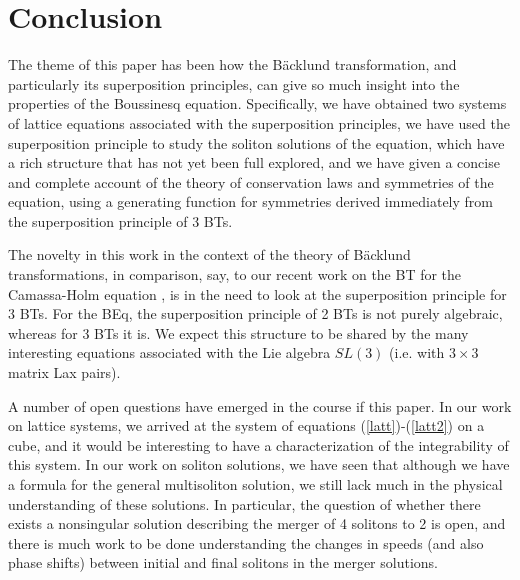 \documentclass[12pt]{article}
\begin{document}


\section{Conclusion}
The theme of this paper has been how the B\"acklund transformation, and particularly its superposition
principles, can give so much insight into the properties of the Boussinesq equation. Specifically, we
have obtained two systems of lattice equations associated with the superposition principles, we have
used the superposition principle to study the soliton solutions of the equation, which have a rich
structure that has not yet been full explored, and we have given a concise and complete account of the
theory of conservation laws and symmetries of the equation, using a generating function for symmetries
derived immediately from the superposition principle of 3 BTs.

The novelty in this work in the context of the theory of B\"acklund transformations, in comparison,
say, to our recent work on the BT for the Camassa-Holm equation \cite{rs2}, 
is in the need to look at the superposition principle for 3 BTs. For the BEq, the superposition principle of
2 BTs is not purely algebraic, whereas for 3 BTs it is. We expect this structure to be shared by the many
interesting equations associated with the Lie algebra $SL(3)$ (i.e. with $3\times 3$ matrix Lax pairs). 

A number of open questions have emerged in the course if this paper. In our work on lattice systems,
we arrived at the system of equations (\ref{latt})-(\ref{latt2}) on a cube, and it would be interesting
to have a characterization of the integrability of this system. In our work on soliton solutions, we have seen
that although we have a formula for the general multisoliton solution, we still lack much in the physical
understanding of these solutions. In particular, the question of whether there exists a nonsingular solution describing
the merger of 4 solitons to 2 is open, and there is much work to be done understanding the changes in 
speeds (and also phase shifts) between  initial and final solitons in the merger solutions. 
\end{document}
